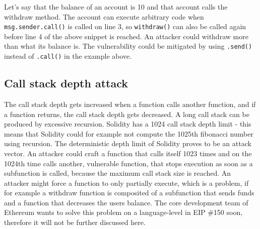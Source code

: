 

Let's say that the balance of an account is 10 and that account calls the withdraw method. The account can execute arbitrary code when \texttt{msg.sender.call()} is called on line 3, so \texttt{withdraw()} can also be called again before line 4 of the above snippet is reached. An attacker could withdraw more than what its balance is. The vulnerability could be mitigated by using \texttt{.send()} instead of \texttt{.call()} in the example above.

\subsection{Call stack depth attack}

The call stack depth gets increased when a function calls another function, and if a function returns, the call stack depth gets decreased. A long call stack can be produced by excessive recursion. Solidity has a 1024 call stack depth limit - this means that Solidity could for example not compute the 1025th fibonacci number using recursion.
The deterministic depth limit of Solidity proves to be an attack vector. An attacker could craft a function that calls itself 1023 times and on the 1024th time calls another, vulnerable function, that stops execution as soon as a subfunction is called, because the maximum call stack size is reached. An attacker might force a function to only partially execute, which is a problem, if for example a withdraw function is composited of a subfunction that sends funds and a function that decreases the users balance.
The core development team of Ethereum wants to solve this problem on a language-level in EIP \#150 soon, therefore it will not be further discussed here.
